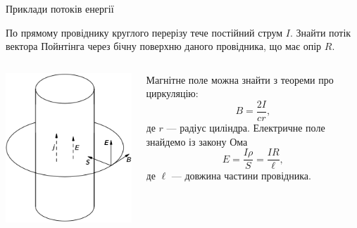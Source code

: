 \documentclass{beamer}
\begin{document}
\begin{frame}[t]{Приклади потоків енергії}{}
	\begin{block}{}\justifying\small
		По прямому провіднику круглого перерізу тече постійний струм $ I $.
		Знайти потік вектора Пойнтінга через бічну поверхню даного провідника,
		що має опір $ R $.
	\end{block}
	\begin{columns}
		\begin{column}{0.3\linewidth}
			\begin{flushleft}
				\includegraphics[width=1\linewidth]{FLC}
			\end{flushleft}
		\end{column}
		\begin{column}{0.7\linewidth}
			\begin{overprint}
				\tiny
				Магнітне поле можна знайти з теореми про циркуляцію:
				\begin{equation*}
					B = \frac{2I}{cr},
				\end{equation*}
				де $ r $ --- радіус циліндра.
				Електричне поле знайдемо із закону Ома
				\begin{equation*}
					E = \frac{I\rho}{S} = \frac{IR}{\ell},
				\end{equation*}
				де $ \ell $ --- довжина частини провідника.


\end{overprint}
\end{column}
\end{columns}
\end{frame}
\end{document}
